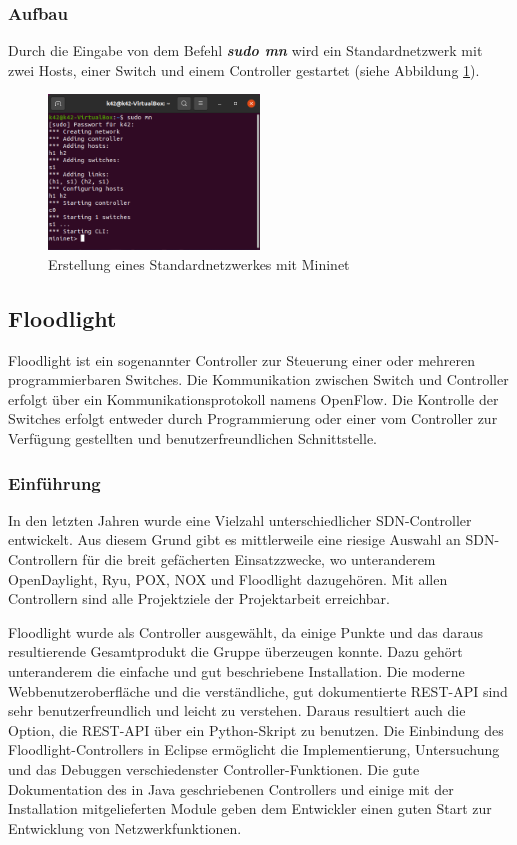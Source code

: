 \documentclass[fontsize=12pt,paper=a4,open=any,parskip=half,
  twoside=false,toc=listof,toc=bibliography,fleqn,leqno,
  captions=nooneline,captions=tableabove,british]{scrbook}
\begin{document}
\subsubsection{Aufbau}
Durch die Eingabe von dem Befehl \textit{\textbf{sudo mn}} wird ein Standardnetzwerk mit zwei Hosts, einer Switch und einem Controller gestartet (siehe Abbildung \ref{sudomn}).

\begin{figure}[H]
 \centering
 \includegraphics[width=0.5\textwidth]{Bilder/sudomn}
 \captionsetup{justification=centering,margin=2cm}
 \caption{Erstellung eines Standardnetzwerkes mit Mininet}
 \label{sudomn}
\end{figure}

\subsection{Floodlight}
Floodlight ist ein sogenannter Controller zur Steuerung einer oder mehreren programmierbaren Switches. Die Kommunikation zwischen Switch und Controller erfolgt über ein Kommunikationsprotokoll namens OpenFlow. Die Kontrolle der Switches erfolgt entweder durch Programmierung oder einer vom Controller zur Verfügung gestellten und benutzerfreundlichen Schnittstelle.

\subsubsection{Einführung}
In den letzten Jahren wurde eine Vielzahl unterschiedlicher SDN-Controller entwickelt. Aus diesem Grund gibt es mittlerweile eine riesige Auswahl an SDN-Controllern für die breit gefächerten Einsatzzwecke, wo unteranderem OpenDaylight, Ryu, POX, NOX und Floodlight dazugehören. Mit allen Controllern sind alle Projektziele der Projektarbeit erreichbar.\par
Floodlight wurde als Controller ausgewählt, da einige Punkte und das daraus resultierende Gesamtprodukt die Gruppe überzeugen konnte. Dazu gehört unteranderem die einfache und gut beschriebene Installation. Die moderne Webbenutzeroberfläche und die verständliche, gut dokumentierte REST-API sind sehr benutzerfreundlich und leicht zu verstehen. Daraus resultiert auch die Option, die REST-API über ein Python-Skript zu benutzen. Die Einbindung des Floodlight-Controllers in Eclipse ermöglicht die Implementierung, Untersuchung und das Debuggen verschiedenster Controller-Funktionen. Die gute Dokumentation des in Java geschriebenen Controllers und einige mit der Installation mitgelieferten Module geben dem Entwickler einen guten Start zur Entwicklung von Netzwerkfunktionen.
\end{document}
